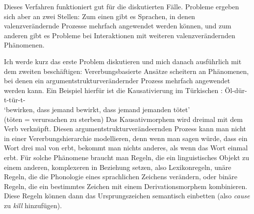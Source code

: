 \noindent
Dieses Verfahren funktioniert gut für die diskutierten Fälle. Probleme ergeben sich aber
an zwei Stellen: Zum einen gibt es Sprachen, in denen valenzverändernde Prozesse mehrfach
angewendet werden können, und zum anderen gibt es Probleme bei Interaktionen mit weiteren valenzverändernden Phänomenen.

Ich werde kurz das erste Problem diskutieren und mich danach ausführlich mit
dem zweiten beschäftigen: Vererbungsbasierte Ansätze scheitern an Phänomenen, bei denen ein argumentstrukturverändernder
Prozess mehrfach angewendet werden kann. Ein Beispiel hierfür ist die Kausativierung im Türkischen
\citep{Lewis67a-u}: 
\ea
Öl-dür-t-tür-t- \\
`bewirken, dass jemand bewirkt, dass jemand jemanden tötet'\\
(töten = verursachen zu sterben)
\z
Das Kausativmorphem  wird dreimal mit dem Verb verknüpft. Diesen argumentstrukturverändeernden
Prozess kann man nicht in einer Vererbungshierarchie modellieren, denn wenn man sagen würde, dass
ein Wort drei mal von  erbt, bekommt man nichts anderes, als wenn das Wort
einmal erbt. Für solche Phänomene braucht man Regeln, die ein
linguistisches Objekt zu einem anderen, komplexeren in Beziehung setzen, also Lexikonregeln, unäre
Regeln, die die Phonologie eines sprachlichen Zeichens verändern, oder binäre Regeln, die ein
bestimmtes Zeichen mit einem Derivationsmorphem kombinieren. Diese Regeln können dann das
Ursprungszeichen semantisch einbetten (also \zb \emph{cause} zu \emph{kill} hinzufügen). 

